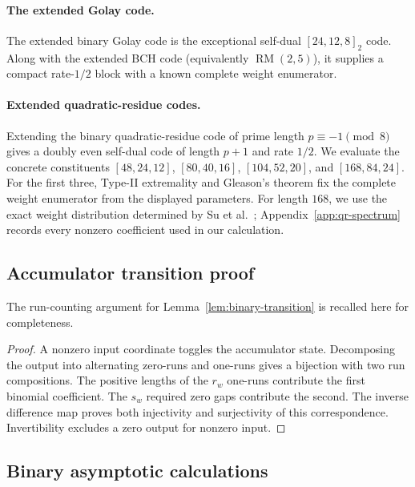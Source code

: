 \paragraph{The extended Golay code.}
The extended binary Golay code is the exceptional self-dual $[24,12,8]_2$
code.  Along with the extended BCH code (equivalently
$\operatorname{RM}(2,5)$), it supplies a compact rate-$1/2$ block with a known
complete weight enumerator.

\paragraph{Extended quadratic-residue codes.}
Extending the binary quadratic-residue code of prime length $p\equiv-1\pmod 8$
gives a doubly even self-dual code of length $p+1$ and rate $1/2$.  We evaluate
the concrete constituents $[48,24,12]$, $[80,40,16]$, $[104,52,20]$, and
$[168,84,24]$.  For the first three, Type-II extremality and Gleason's theorem
fix the complete weight enumerator from the displayed parameters.  For length
$168$, we use the exact weight distribution determined by Su et
al.~\cite{su08}; Appendix~\ref{app:qr-spectrum} records every nonzero
coefficient used in our calculation.




\subsection{Accumulator transition proof}
\label{app:binary-analysis}
The run-counting argument for Lemma~\ref{lem:binary-transition} is recalled here for completeness.
\begin{proof}
A nonzero input coordinate toggles the accumulator state.  Decomposing the
output into alternating zero-runs and one-runs gives a bijection with two run
compositions.  The positive lengths of the $r_w$ one-runs contribute the first
binomial coefficient.  The $s_w$ required zero gaps contribute the second.
The inverse difference map proves both injectivity and surjectivity of this
correspondence.  Invertibility excludes a zero output for nonzero input.
\end{proof}



\subsection{Binary asymptotic calculations}
\label{app:binary-asymptotics}

